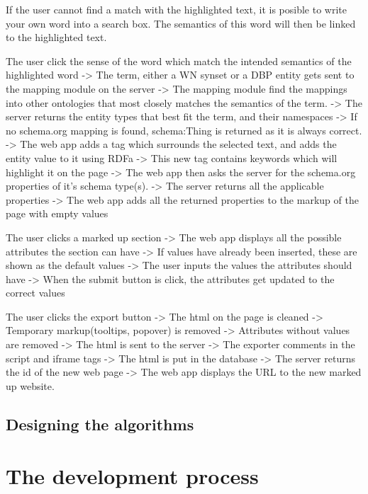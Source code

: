 	If the user cannot find a match with the highlighted text, 
	it is posible to write your own word into a search box. 
	The semantics of this word will then be linked to the highlighted text.

The user click the sense of the word which match the intended semantics of the highlighted word
	-> The term, either a WN synset or a DBP entity gets sent to the mapping module on the server
	-> The mapping module find the mappings into other ontologies 
		that most closely matches the semantics of the term.
	-> The server returns the entity types that best fit the term, and their namespaces
		-> If no schema.org mapping is found, schema:Thing is returned as it is always correct.
	-> The web app adds a tag which surrounds the selected text, and adds the entity value to it using RDFa
		-> This new tag contains keywords which will highlight it on the page
	-> The web app then asks the server for the schema.org properties of it's schema type(s).
	-> The server returns all the applicable properties
	-> The web app adds all the returned properties to the markup of the page with empty values

The user clicks a marked up section
	-> The web app displays all the possible attributes the section can have
		-> If values have already been inserted, these are shown as the default values
	-> The user inputs the values the attributes should have
	-> When the submit button is click, the attributes get updated to the correct values

The user clicks the export button
	-> The html on the page is cleaned
		-> Temporary markup(tooltips, popover) is removed
		-> Attributes without values are removed
	-> The html is sent to the server
		-> The exporter comments in the script and iframe tags
		-> The html is put in the database
	-> The server returns the id of the new web page
	-> The web app displays the URL to the new marked up website. 

\subsection{Designing the algorithms}


\section{The development process}